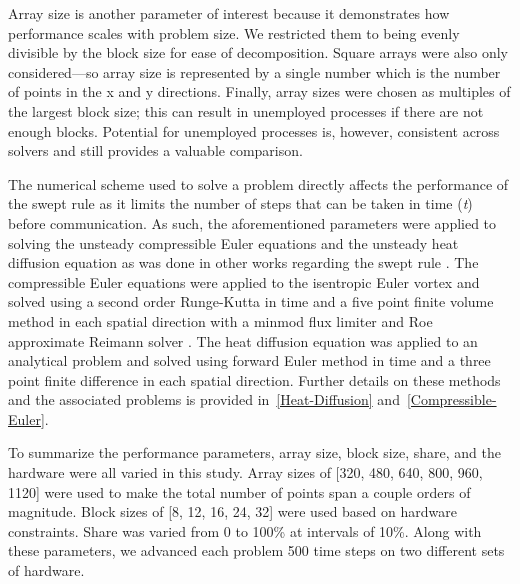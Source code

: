 \documentclass[review]{elsarticle}
\begin{document}
\par
Array size is another parameter of interest because it demonstrates how performance scales with problem size. We restricted them to being evenly divisible by the block size for ease of decomposition. Square arrays were also only considered---so array size is represented by a single number which is the number of points in the x and y directions. Finally, array sizes were chosen as multiples of the largest block size; this can result in unemployed processes if there are not enough blocks. Potential for unemployed processes is, however, consistent across solvers and still provides a valuable comparison.

\par
The numerical scheme used to solve a problem directly affects the performance of the swept rule as it limits the number of steps that can be taken in time (\textit{t}) before communication. As such, the aforementioned parameters were applied to solving the unsteady compressible Euler equations and the unsteady heat diffusion equation as was done in other works regarding the swept rule \cite{Alhubail2016ThePDEs,Alhubail2018ThePDEs,Magee2018AcceleratingDecomposition, Magee2020ApplyingSystems}. The compressible Euler equations were applied to the isentropic Euler vortex and solved using a second order Runge-Kutta in time and a five point finite volume method in each spatial direction with a minmod flux limiter and Roe approximate Reimann solver \cite{SpiegelAMethods,Leveque2002FiniteProblems}. The heat diffusion equation was applied to an analytical problem and solved using forward Euler method in time and a three point finite difference in each spatial direction. Further details on these methods and the associated problems is provided in~\ref{Heat-Diffusion} and~\ref{Compressible-Euler}.

\par
To summarize the performance parameters, array size, block size, share, and the hardware were all varied in this study. Array sizes of [320, 480, 640, 800, 960, 1120] were used to make the total number of points span a couple orders of magnitude. Block sizes of [8, 12, 16, 24, 32] were used based on hardware constraints. Share was varied from 0 to 100\% at intervals of 10\%. Along with these parameters, we advanced each problem 500 time steps on two different sets of hardware.
\end{document}
